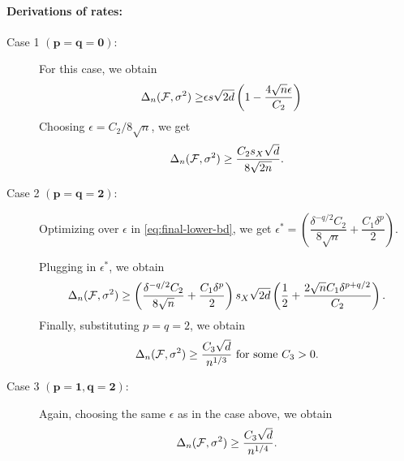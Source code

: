 \paragraph{Derivations of rates:}
\begin{description}
 \item[Case 1 $\bm{(p=q=0)}$:] For this case, we obtain
 \begin{align*}
 \Delta_n(\mathcal{F}, \sigma^2) 
  \ge & \epsilon s \sqrt{2d} \left(1 -   \dfrac{4\sqrt{
    n}\epsilon}{C_2}
  \right)
\end{align*}
Choosing $\epsilon= C_2/ 8 \sqrt{n}$, we get 
$$\Delta_n(\mathcal{F}, \sigma^2) \ge \dfrac{C_2 s_{X} \sqrt{d}}{ 8 \sqrt{2n}}.$$

 \item[Case 2 $\bm{(p=q=2)}$:] 
 Optimizing over $\epsilon$ in \eqref{eq:final-lower-bd}, we get
 $\epsilon^* = \left(\dfrac{\delta^{-q/2}C_2}{8\sqrt{n}} + \dfrac{C_1\delta^p}{2}\right)$.

 Plugging in $\epsilon^*$, we obtain
 $$\Delta_n(\mathcal{F}, \sigma^2) 
 \ge \left(\dfrac{\delta^{-q/2}C_2}{8\sqrt{n}} + \dfrac{C_1\delta^p}{2}\right) s_{X} \sqrt{2d} \left( \dfrac{1}{2} + \dfrac{2\sqrt{n}C_1 \delta^{p + q/2}}{C_2} \right).$$
 Finally, substituting $p=q=2$, we obtain
$$\Delta_n(\mathcal{F}, \sigma^2) \ge \dfrac{C_3 \sqrt{d}}{ n^{1/3}} \text{ for some } C_3>0.$$

 \item[Case 3 $\bm{(p=1, q=2)}$:] 
 Again, choosing the same $\epsilon$ as in the case above, we obtain
$$\Delta_n(\mathcal{F}, \sigma^2) \ge \dfrac{C_3 \sqrt{d}}{ n^{1/4}}.$$

\end{description}

